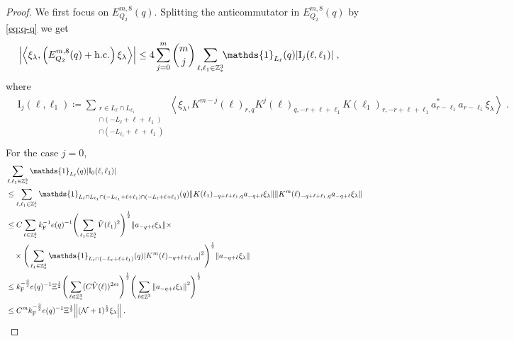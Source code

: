 \documentclass[12pt,a4paper]{article}
\numberwithin{equation}{section}
\newcommand{\1}{\mathbb{I}}
\newcommand{\F}{\mathrm{F}}
\newcommand{\I}{\mathrm{I}}
\newcommand{\Z}{\mathbb{Z}}
\newcommand{\NN}{\mathcal{N}}
\newcommand{\half}{\frac{1}{2}}
\newcommand{\eva}[1]{\left\langle #1 \right\rangle}
\theoremstyle{plain}
\theoremstyle{definition}
\theoremstyle{remark}
\theoremstyle{plain}
\theoremstyle{definition}
\theoremstyle{remark}
\begin{document}
\begin{proof}
We first focus on $ E^{m,8}_{Q_2}(q) $.
Splitting the anticommutator in $ E^{m,8}_{Q_2}(q) $ by \eqref{eq:q-q} we get
\begin{equation} \label{eq:EQ2181}
\begin{aligned}
	& \abs{\eva{\xi_\lambda,\left(E^{m,8}_{Q_2}(q) + \mathrm{h.c.}\right) \xi_\lambda }}
	\le 4 \sum_{j=0}^m {{m}\choose j} \sum_{\ell,\ell_1 \in \Z^3_*}\!\! \mathds{1}_{L_\ell}(q) |\I_j(\ell, \ell_1)| \;,
	\end{aligned}
\end{equation}
where
\begin{equation}
\begin{aligned}
	& \I_j(\ell, \ell_1)
	\coloneq \sum_{\substack{r\in L_{\ell} \cap L_{\ell_1}\\\cap (-L_{\ell}+\ell+\ell_1) \\ \cap (-L_{\ell_1}+\ell+\ell_1)}}
		\eva{\xi_\lambda, K^{m-j}(\ell)_{r,q} K^{j}(\ell)_{q,-r+\ell+\ell_1} K(\ell_1)_{r,-r+\ell+\ell_1} a^*_{r-\ell_1} a_{r-\ell_1} \xi_\lambda} \;. \\
\end{aligned}
\end{equation}
For the case $ j = 0 $,
\begin{align}
	&\sum_{\ell,\ell_1 \in \Z^3_*} \mathds{1}_{L_\ell}(q) |\I_0(\ell, \ell_1)| \nonumber\\
	&\leq \sum_{\ell,\ell_1 \in \Z^3_*} \mathds{1}_{L_\ell \cap L_{\ell_1} \cap (-L_{\ell_1} + \ell + \ell_1) \cap (-L_\ell + \ell + \ell_1)}(q)
		\norm{ K(\ell_1)_{-q+\ell+\ell_1,q} a_{-q+\ell} \xi_\lambda}
		\norm{ K^m(\ell)_{-q+\ell+\ell_1,q} a_{-q+\ell} \xi_\lambda } \nonumber\\
	&\leq C \sum_{\ell \in \Z^3_*} k_{\F}^{-1} e(q)^{-1}
		\Bigg( \sum_{\ell_1 \in \Z^3_*} \hat{V}(\ell_1)^2 \Bigg)^{\half}
		\norm{ a_{-q+\ell} \xi_\lambda} \times \nonumber\\
	&\quad \times \Bigg( \sum_{\ell_1 \in \Z^3_*} \mathds{1}_{L_\ell \cap (-L_\ell + \ell + \ell_1)}(q) |K^m(\ell)_{-q+\ell+\ell_1,q}|^2 \Bigg)^{\half}
		\norm{ a_{-q+\ell} \xi_\lambda } \nonumber\\
	&\leq k_{\F}^{-\frac 32} e(q)^{-1} \Xi^\half
		\Bigg( \sum_{\ell \in \Z^3_*} (C \hat{V}(\ell))^{2m} \Bigg)^{\half}
		\Bigg( \sum_{\ell \in \Z^3} \norm{a_{-q+\ell} \xi_\lambda }^2 \Bigg)^{\half} \nonumber\\
	&\leq C^m k_{\F}^{-\frac 32} e(q)^{-1} \Xi^{\half} \norm{(\NN+1)^{\half} \xi_\lambda} \;. \label{eq:estEQ2181}

\end{align}
\end{proof}
\end{document}
